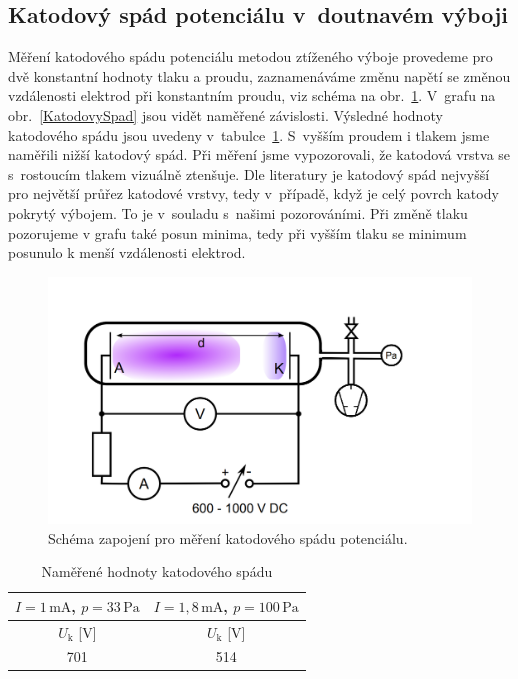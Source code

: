 \documentclass[a4paper,12pt]{article}
\begin{document}
\subsection{Katodový spád potenciálu v~doutnavém výboji}
Měření katodového spádu potenciálu metodou ztíženého výboje provedeme pro dvě konstantní hodnoty tlaku a proudu, 
zaznamenáváme změnu napětí se změnou vzdálenosti elektrod při konstantním 
proudu, viz schéma na obr.~\ref{schema2v2}. V~grafu na 
obr.~\ref{KatodovySpad} jsou vidět naměřené závislosti. Výsledné hodnoty 
katodového spádu jsou uvedeny v~tabulce~\ref{tab2}. S~vyšším proudem i tlakem
jsme naměřili nižší katodový spád. Při měření jsme vypozorovali, 
že katodová vrstva se s~rostoucím tlakem vizuálně ztenšuje. Dle literatury je 
katodový spád nejvyšší pro největší průřez katodové vrstvy, tedy v~případě, 
když je 
celý povrch katody pokrytý výbojem. To je v~souladu s~našimi pozorováními. 
Při změně tlaku pozorujeme v grafu také posun minima, tedy při vyšším tlaku se 
minimum posunulo k menší vzdálenosti elektrod.  

	  


\begin{figure}[h!]
	\centering
	\includegraphics[width=145mm]{schema2v2.png}
	\caption{Schéma zapojení pro měření katodového spádu potenciálu.}
	\label{schema2v2}
\end{figure}

\begin{center}
	\begin{table}[h!]
		\centering
		\caption{Naměřené hodnoty katodového spádu}
		\label{tab2}
		\begin{tabular}{|c|c|} \hline
			$I = 1\,\si{\milli\ampere}$, $p = 33\,\si{\pascal}$ 
			& $I = 1,8\,\si{\milli\ampere}$, $p = 100\,\si{\pascal}$\\ \hline
			$U_\text{k}$ [V] & $U_\text{k}$ [V]\\ \hline
			701 & 514 \\ \hline
			
		\end{tabular}
	\end{table}
\end{center}
\end{document}

